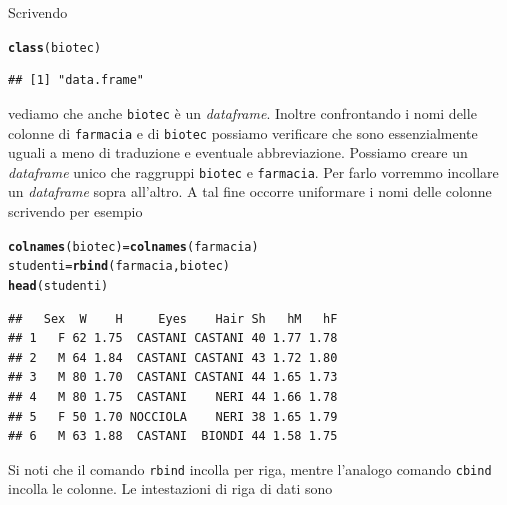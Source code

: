 \documentclass[onecolumn,12pt]{book}\usepackage[]{graphicx}\usepackage[]{color}
\makeatletter
\newcommand{\hlstd}[1]{\textcolor[rgb]{0.345,0.345,0.345}{#1}}%
\newcommand{\hlkwb}[1]{\textcolor[rgb]{0.69,0.353,0.396}{#1}}%
\newcommand{\hlkwd}[1]{\textcolor[rgb]{0.737,0.353,0.396}{\textbf{#1}}}%
\newenvironment{kframe}{%
 \def\at@end@of@kframe{}%
 \ifinner\ifhmode%
  \def\at@end@of@kframe{\end{minipage}}%
  \begin{minipage}{\columnwidth}%
 \fi\fi%
 \def\FrameCommand##1{\hskip\@totalleftmargin \hskip-\fboxsep
 \colorbox{shadecolor}{##1}\hskip-\fboxsep
     \hskip-\linewidth \hskip-\@totalleftmargin \hskip\columnwidth}%
 \MakeFramed {\advance\hsize-\width
   \@totalleftmargin\z@ \linewidth\hsize
   \@setminipage}}%
 {\par\unskip\endMakeFramed%
 \at@end@of@kframe}
\newenvironment{knitrout}{}{} %
\makeatother
\begin{document}
Scrivendo
\begin{knitrout}
\color{fgcolor}\begin{kframe}
\begin{alltt}
\hlkwd{class}\hlstd{(biotec)}
\end{alltt}
\begin{verbatim}
## [1] "data.frame"
\end{verbatim}
\end{kframe}
\end{knitrout}
vediamo che anche \texttt{biotec} \`e un \emph{dataframe}.  Inoltre confrontando i nomi delle colonne di \texttt{farmacia} e di \texttt{biotec} possiamo verificare che sono essenzialmente uguali a meno di traduzione e eventuale abbreviazione.
Possiamo creare un \emph{dataframe} unico che raggruppi \texttt{biotec} e \texttt{farmacia}. Per farlo  vorremmo incollare un \emph{dataframe} sopra all'altro.
A tal fine occorre uniformare i nomi delle colonne scrivendo per esempio
\begin{knitrout}
\color{fgcolor}\begin{kframe}
\begin{alltt}
\hlkwd{colnames}\hlstd{(biotec)}\hlkwb{=}\hlkwd{colnames}\hlstd{(farmacia)}
\hlstd{studenti}\hlkwb{=}\hlkwd{rbind}\hlstd{(farmacia,biotec)}
\hlkwd{head}\hlstd{(studenti)}
\end{alltt}
\begin{verbatim}
##   Sex  W    H     Eyes    Hair Sh   hM   hF
## 1   F 62 1.75  CASTANI CASTANI 40 1.77 1.78
## 2   M 64 1.84  CASTANI CASTANI 43 1.72 1.80
## 3   M 80 1.70  CASTANI CASTANI 44 1.65 1.73
## 4   M 80 1.75  CASTANI    NERI 44 1.66 1.78
## 5   F 50 1.70 NOCCIOLA    NERI 38 1.65 1.79
## 6   M 63 1.88  CASTANI  BIONDI 44 1.58 1.75
\end{verbatim}
\end{kframe}
\end{knitrout}
Si noti che il comando \texttt{rbind}  incolla per riga, mentre l'analogo comando \texttt{cbind}
 incolla le colonne.
Le intestazioni di riga di dati sono
\end{document}
